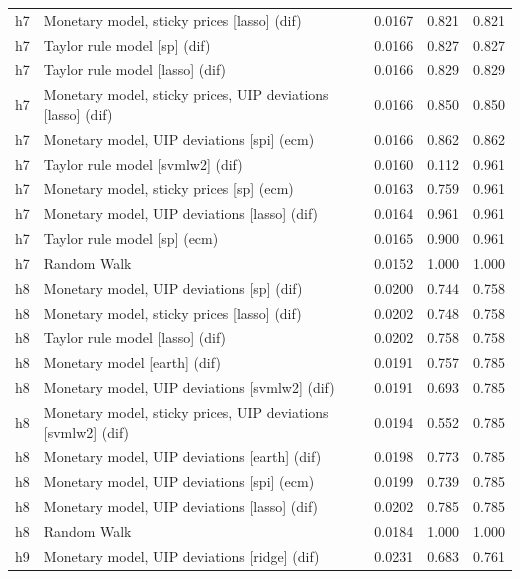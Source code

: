 \begin{ThreePartTable}
\begin{longtable}[t]{cp{5.5cm}ccc}
h7 & \raggedright Monetary model, sticky prices [lasso] (dif) & 0.0167 & 0.821 & 0.821\\
h7 & \raggedright Taylor rule model [sp] (dif) & 0.0166 & 0.827 & 0.827\\
h7 & \raggedright Taylor rule model [lasso] (dif) & 0.0166 & 0.829 & 0.829\\
h7 & \raggedright Monetary model, sticky prices, UIP deviations [lasso] (dif) & 0.0166 & 0.850 & 0.850\\
h7 & \raggedright Monetary model, UIP deviations [spi] (ecm) & 0.0166 & 0.862 & 0.862\\
h7 & \raggedright Taylor rule model [svmlw2] (dif) & 0.0160 & 0.112 & 0.961\\
h7 & \raggedright Monetary model, sticky prices [sp] (ecm) & 0.0163 & 0.759 & 0.961\\
h7 & \raggedright Monetary model, UIP deviations [lasso] (dif) & 0.0164 & 0.961 & 0.961\\
h7 & \raggedright Taylor rule model [sp] (ecm) & 0.0165 & 0.900 & 0.961\\
h7 & \raggedright Random Walk & 0.0152 & 1.000 & 1.000\\
\addlinespace
h8 & \raggedright Monetary model, UIP deviations [sp] (dif) & 0.0200 & 0.744 & 0.758\\
h8 & \raggedright Monetary model, sticky prices [lasso] (dif) & 0.0202 & 0.748 & 0.758\\
h8 & \raggedright Taylor rule model [lasso] (dif) & 0.0202 & 0.758 & 0.758\\
h8 & \raggedright Monetary model [earth] (dif) & 0.0191 & 0.757 & 0.785\\
h8 & \raggedright Monetary model, UIP deviations [svmlw2] (dif) & 0.0191 & 0.693 & 0.785\\
h8 & \raggedright Monetary model, sticky prices, UIP deviations [svmlw2] (dif) & 0.0194 & 0.552 & 0.785\\
h8 & \raggedright Monetary model, UIP deviations [earth] (dif) & 0.0198 & 0.773 & 0.785\\
h8 & \raggedright Monetary model, UIP deviations [spi] (ecm) & 0.0199 & 0.739 & 0.785\\
h8 & \raggedright Monetary model, UIP deviations [lasso] (dif) & 0.0202 & 0.785 & 0.785\\
h8 & \raggedright Random Walk & 0.0184 & 1.000 & 1.000\\
\addlinespace
h9 & \raggedright Monetary model, UIP deviations [ridge] (dif) & 0.0231 & 0.683 & 0.761\\

\end{longtable}
\end{ThreePartTable}
